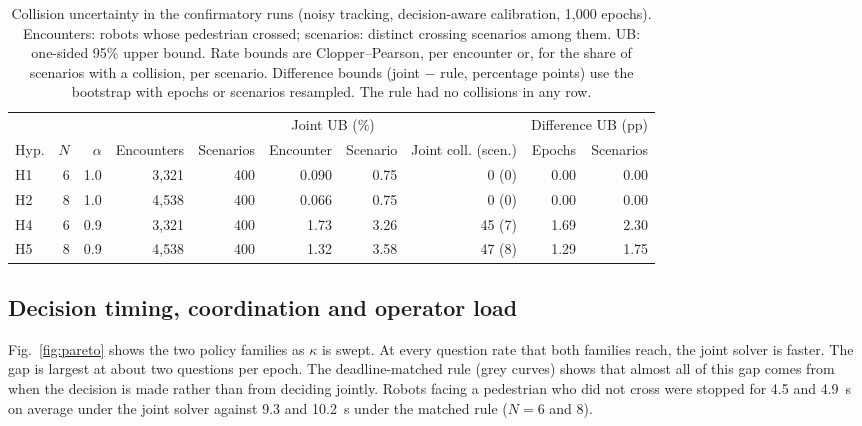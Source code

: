 \documentclass[a4paper,fleqn]{cas-dc}
\begin{document}
\begin{table}
\centering
\caption{Collision uncertainty in the confirmatory runs (noisy tracking, decision-aware calibration, 1{,}000 epochs). Encounters: robots whose pedestrian crossed; scenarios: distinct crossing scenarios among them. UB: one-sided 95\% upper bound. Rate bounds are Clopper--Pearson, per encounter or, for the share of scenarios with a collision, per scenario. Difference bounds (joint $-$ rule, percentage points) use the bootstrap with epochs or scenarios resampled. The rule had no collisions in any row.}
\label{tab:bounds}
\begin{tabular*}{\textwidth}{@{\extracolsep{\fill}}lrrrrrrrrr}
\toprule
 & & & & & \multicolumn{2}{c}{Joint UB (\%)} & & \multicolumn{2}{c}{Difference UB (pp)} \\
\cmidrule(lr){6-7}\cmidrule(lr){9-10}
Hyp. & $N$ & $\alpha$ & Encounters & Scenarios & Encounter & Scenario & Joint coll. (scen.) & Epochs & Scenarios \\
\midrule
H1 & 6 & 1.0 & 3{,}321 & 400 & 0.090 & 0.75 & 0 (0) & 0.00 & 0.00 \\
H2 & 8 & 1.0 & 4{,}538 & 400 & 0.066 & 0.75 & 0 (0) & 0.00 & 0.00 \\
H4 & 6 & 0.9 & 3{,}321 & 400 & 1.73 & 3.26 & 45 (7) & 1.69 & 2.30 \\
H5 & 8 & 0.9 & 4{,}538 & 400 & 1.32 & 3.58 & 47 (8) & 1.29 & 1.75 \\
\bottomrule
\end{tabular*}
\end{table}

\subsection{Decision timing, coordination and operator load}
\label{sec:res-pareto}

Fig.~\ref{fig:pareto} shows the two policy families as $\kappa$ is swept. At every question rate that both families reach, the joint solver is faster. The gap is largest at about two questions per epoch. The deadline-matched rule (grey curves) shows that almost all of this gap comes from when the decision is made rather than from deciding jointly. Robots facing a pedestrian who did not cross were stopped for 4.5 and \SI{4.9}{s} on average under the joint solver against 9.3 and \SI{10.2}{s} under the matched rule ($N = 6$ and 8).
\end{document}
